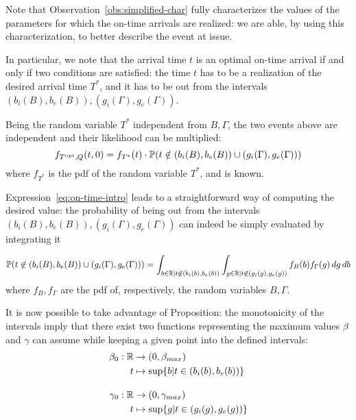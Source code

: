 Note that Observation~\ref{obs:simplified-char} fully characterizes the values of the parameters for which the on-time arrivals are realized:
we are able, by using this characterization, to better describe the event at issue.

In particular, we note that the arrival time \(t\) is an optimal on-time arrival if and only if two conditions are satisfied:
the time \(t\) has to be a realization of the desired arrival time \(T^*\),
and it has to  be out from the intervals \((b_i(B), b_e(B)), (g_i(\Gamma), g_e(\Gamma))\).

Being the random variable \(T^*\) independent from \(B, \Gamma\),
the two events above are independent and their likelihood can be multiplied:
\begin{equation}
  \label{eq:on-time-intro}
  f_{T^{opt}, Q}(t, 0) = f_{T^*}(t) \cdot \mathbb{P}(t \notin (b_i(B), b_e(B)) \cup (g_i(\Gamma), g_e(\Gamma)))
\end{equation}
where \(f_{T^*}\) is the pdf of the random variable \(T^*\), and is known.

Expression~\eqref{eq:on-time-intro} leads to a straightforward way of computing the desired value:
the probability of being out from the intervals \((b_i(B), b_e(B)), (g_i(\Gamma), g_e(\Gamma))\) can indeed be simply evaluated by integrating it

\begin{equation}
  \label{eq:prob-not-intervals}
  \mathbb{P}( t \not\in (b_i(B), b_e(B)) \cup (g_i(\Gamma), g_e(\Gamma))) = \int_{b\in \mathbb{R} \vert t \not\in (b_i(b), b_e(b))}\int_{g \in \mathbb{R} \vert t \not\in (g_i(g), g_e(g))}f_B(b)f_\Gamma(g)\, dg\, db
\end{equation}
where \(f_B, f_\Gamma\) are the pdf of, respectively, the random variables \(B, \Gamma\).


It is now possible to take advantage of Proposition:
the monotonicity of the intervals imply that there exist two functions representing the maximum values \(\beta\) and \(\gamma\) can assume while keeping a given point into the defined intervals:
\begin{equation}
  \label{eq:def_b_0_g_0}
  \begin{split}
    \beta_0:\mathbb{R}&\rightarrow(0, \beta_{max}) \\
    t&\mapsto \sup\{b | t \in (b_i(b), b_e(b))\} \\[1em]
    \gamma_0:\mathbb{R}&\rightarrow(0, \gamma_{max}) \\
    t&\mapsto \sup\{g | t \in (g_i(g), g_e(g))\}
  \end{split}
\end{equation}

